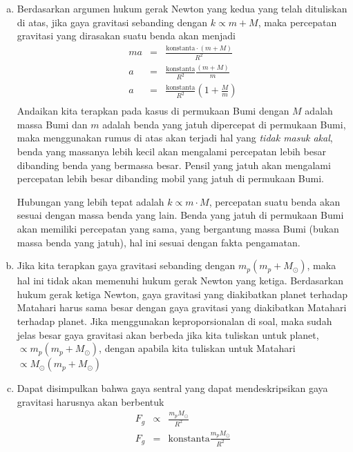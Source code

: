 \documentclass[11pt,fleqn]{exam}
\begin{document}
\begin{questions}
\begin{enumerate}[a.]
    \item Berdasarkan argumen hukum gerak Newton yang kedua yang telah dituliskan di atas, jika gaya gravitasi sebanding dengan $k \propto m + M$, maka percepatan gravitasi yang dirasakan suatu benda akan menjadi
    \begin{eqnarray*}
        m a &=& \frac{\text{konstanta} \cdot (m + M)}{R^2}\\
        a &=& \frac{\text{konstanta}}{R^2} \frac{(m + M)}{m}\\
        a &=& \frac{\text{konstanta}}{R^2} \left(1 + \frac{M}{m}\right)\\
    \end{eqnarray*}
    Andaikan kita terapkan pada kasus di permukaan Bumi dengan $M$ adalah massa Bumi dan $m$ adalah benda yang jatuh dipercepat di permukaan Bumi, maka menggunakan rumus di atas akan terjadi hal yang \textit{tidak masuk akal}, benda yang massanya lebih kecil akan mengalami percepatan lebih besar dibanding benda yang bermassa besar. Pensil yang jatuh akan mengalami percepatan lebih besar dibanding mobil yang jatuh di permukaan Bumi.

    Hubungan yang lebih tepat adalah $k \propto m \cdot M$, percepatan suatu benda akan sesuai dengan massa benda yang lain. Benda yang jatuh di permukaan Bumi akan memiliki percepatan yang sama, yang bergantung massa Bumi (bukan massa benda yang jatuh), hal ini sesuai dengan fakta pengamatan.
    
    \item Jika kita terapkan gaya gravitasi sebanding dengan $m_p (m_p + M_\odot)$, maka hal ini tidak akan memenuhi hukum gerak Newton yang ketiga. Berdasarkan hukum gerak ketiga Newton, gaya gravitasi yang diakibatkan planet terhadap Matahari harus sama besar dengan gaya gravitasi yang diakibatkan Matahari terhadap planet. Jika menggunakan keproporsionalan di soal, maka sudah jelas besar gaya gravitasi akan berbeda jika kita tuliskan untuk planet, $\propto m_p (m_p + M_\odot)$, dengan apabila kita tuliskan untuk Matahari $\propto M_\odot (m_p + M_\odot)$
    
    \item Dapat disimpulkan bahwa gaya sentral yang dapat mendeskripsikan gaya gravitasi harusnya akan berbentuk
    \begin{eqnarray*}
        F_g &\propto& \frac{m_p M_\odot}{R^2}\\ 
        F_g &=& \text{konstanta} \frac{m_p M_\odot}{R^2}
    \end{eqnarray*}


\end{enumerate}
\end{questions}
\end{document}
